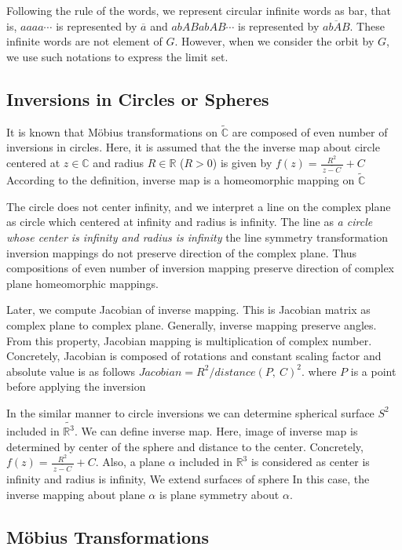 Following the rule of the words, we represent circular infinite words as
bar, that is, $aaaa\cdots$ is represented by $\overline{a}$ and $abABabAB \cdots$ 
is represented by $\overline{abAB}$.
These infinite words are not element of $G$. However, when we consider
the orbit by $G$, we use such notations to express the limit set.

\subsection{Inversions in Circles or Spheres}

It is known that M\"obius transformations on $\tilde{\mathbb{C}}$
are composed of even number of inversions in circles.
Here, it is assumed that the the inverse map about circle centered at
$z\in\mathbb{C}$ and radius $R\in\mathbb{R}$ ($R>0$)
is given by
$f(z) = \frac{R^2}{~\overline{z -C}~} + C$
According to the definition, inverse map is a homeomorphic mapping on
$\tilde{\mathbb{C}}$

The circle does not center infinity, and we interpret a line on the
complex plane as circle which centered at infinity and radius is
infinity.
The line as \textit{a circle whose center is infinity and radius is
infinity}
the line symmetry transformation
inversion mappings do not preserve direction of the complex plane.
Thus compositions of even number of inversion mapping preserve direction
of complex plane homeomorphic mappings.

Later, we compute Jacobian of inverse mapping.
This is Jacobian matrix as complex plane to complex plane.
Generally, inverse mapping preserve angles.
From this property, Jacobian mapping is multiplication of complex
number.
Concretely, Jacobian is composed of rotations and constant scaling
factor and absolute value is as follows
$Jacobian = R^2 / distance(P,~C)^2$.
where $P$ is a point before applying the inversion

In the similar manner to circle inversions we can determine spherical
surface $S^2$ included in $\tilde{\mathbb{R}^3}$.
We can define inverse map.
Here, image of inverse map is determined by center of the sphere and
distance to the center. Concretely, $f(z) = \frac{R^2}{~\overline{z -C}~} + C$.
Also, a plane $\alpha$ included in $\mathbb{R}^3$ is considered as
center is infinity and radius is infinity,
We extend surfaces of sphere
In this case, the inverse mapping about plane $\alpha$ is plane symmetry
about $\alpha$.

\subsection{M\"obius Transformations}

